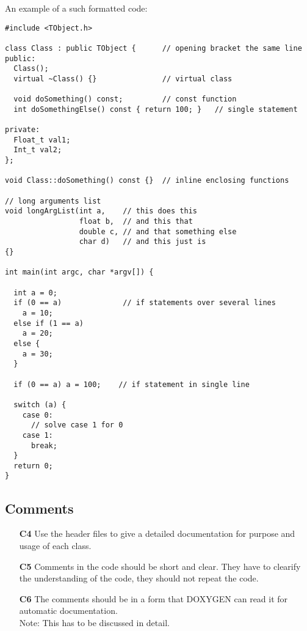 \documentclass[a4paper,10pt]{article}
\begin{document}
An example of a such formatted code:
\begin{verbatim}
#include <TObject.h>

class Class : public TObject {      // opening bracket the same line
public:
  Class();
  virtual ~Class() {}               // virtual class

  void doSomething() const;         // const function
  int doSomethingElse() const { return 100; }   // single statement

private:
  Float_t val1;
  Int_t val2;
};

void Class::doSomething() const {}  // inline enclosing functions

// long arguments list
void longArgList(int a,    // this does this
                 float b,  // and this that
                 double c, // and that something else
                 char d)   // and this just is
{}

int main(int argc, char *argv[]) {

  int a = 0;
  if (0 == a)              // if statements over several lines
    a = 10;
  else if (1 == a)
    a = 20;
  else {
    a = 30;
  }

  if (0 == a) a = 100;    // if statement in single line

  switch (a) {
    case 0:
      // solve case 1 for 0
    case 1:
      break;
  }
  return 0;
}
\end{verbatim}

\subsection{Comments}
\begin{itemize}
\item[\bf C4] Use the header files to give a detailed documentation for
  purpose and usage of each class.
\item[\bf C5] Comments in the code should be short and clear. They have to
  clearify the understanding of the code, they should not repeat the code.
\item[\bf C6] The comments should be in a form that DOXYGEN can read it for
  automatic documentation.\\
  {\rm Note: This has to be discussed in detail.}
\end{itemize}
\end{document}
